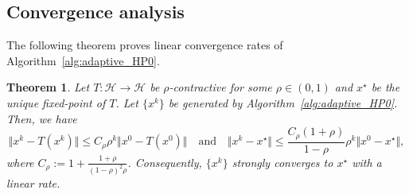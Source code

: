\documentclass{article}
\theoremstyle{plain}
\newtheorem{theorem}{Theorem}[section]
\theoremstyle{definition}
\newcommand{\Hil}{\mathcal{H}}
\newcommand{\sets}[1]{\{#1\}}
\newcommand{\norms}[1]{\Vert#1\Vert}
\newcommand{\0}{\boldsymbol{0}}
\begin{document}
\subsection{Convergence analysis}\label{subsec:convergence_guarantee_of_A1}
The following theorem proves linear convergence rates of Algorithm~\ref{alg:adaptive_HP0}.

\begin{theorem}\label{th:convergence_theorem1}
Let $T : \Hil \to \Hil$ be $\rho$-contractive for some $\rho \in (0, 1)$ and $x^{\star}$ be the unique fixed-point of $T$.
Let $\sets{x^k}$ be generated by Algorithm~\ref{alg:adaptive_HP0}.
Then, we have
\begin{equation}\label{eq:convergence_bound1}
\norms{x^k - T(x^k)} \leq  C_{\rho} \rho^k \norms{x^0 - T(x^0)} \quad \textrm{and} \quad \norms{x^k - x^{\star}} \leq \frac{C_{\rho}(1+\rho)}{1-\rho} \rho^k \norms{x^0 - x^{\star}},
\end{equation}
where $C_{\rho} := 1 + \frac{1+\rho}{(1-\rho)^2\rho}$.
Consequently, $\sets{x^k}$ strongly converges to $x^{\star}$ with a linear rate.
\end{theorem}
\end{document}
